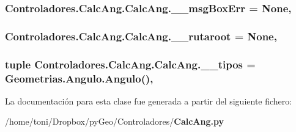 \subsubsection[{\-\_\-\-\_\-msg\-Box\-Err}]{\setlength{\rightskip}{0pt plus 5cm}Controladores.\-Calc\-Ang.\-Calc\-Ang.\-\_\-\-\_\-msg\-Box\-Err = None\hspace{0.3cm}{\ttfamily [static]}, {\ttfamily [private]}}\label{classControladores_1_1CalcAng_1_1CalcAng_ac08e9a83e87ecd92eba7bbd674b61327}
\subsubsection[{\-\_\-\-\_\-rutaroot}]{\setlength{\rightskip}{0pt plus 5cm}Controladores.\-Calc\-Ang.\-Calc\-Ang.\-\_\-\-\_\-rutaroot = None\hspace{0.3cm}{\ttfamily [static]}, {\ttfamily [private]}}\label{classControladores_1_1CalcAng_1_1CalcAng_a32ffabca09bcba8d16f7f24b788abab8}
\subsubsection[{\-\_\-\-\_\-tipos}]{\setlength{\rightskip}{0pt plus 5cm}tuple Controladores.\-Calc\-Ang.\-Calc\-Ang.\-\_\-\-\_\-tipos = {\bf Geometrias.\-Angulo.\-Angulo}()\hspace{0.3cm}{\ttfamily [static]}, {\ttfamily [private]}}\label{classControladores_1_1CalcAng_1_1CalcAng_a666a152dd23b2e153e63194102ca5588}


La documentación para esta clase fue generada a partir del siguiente fichero\-:\begin{DoxyCompactItemize}
\item 
/home/toni/\-Dropbox/py\-Geo/\-Controladores/{\bf Calc\-Ang.\-py}\end{DoxyCompactItemize}
